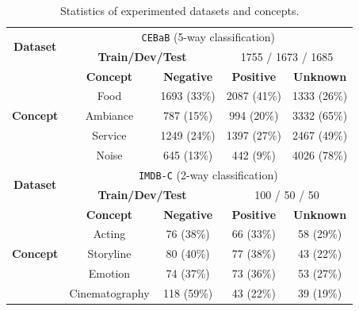 \documentclass[letterpaper]{article} %
\begin{document}
\begin{table}[t]
\centering
\setlength{\tabcolsep}{1pt} %
\fontsize{9pt}{10pt}\selectfont
\begin{tabular}{@{}c|cccc@{}}
\toprule
\multirow{2}{*}{\textbf{Dataset}} & \multicolumn{4}{c}{\texttt{CEBaB}    (5-way classification)}                                   \\ \cmidrule(l){2-5}
                                  & \multicolumn{2}{c|}{\textbf{Train/Dev/Test}} & \multicolumn{2}{c}{1755 / 1673 / 1685} \\ \midrule
\multirow{5}{*}{\textbf{Concept}} & \textbf{Concept}      & \textbf{Negative}    & \textbf{Positive}  & \textbf{Unknown}  \\ \cmidrule(l){2-5}
                                  & Food                  & 1693 (33\%)        & 2087 (41\%)      & 1333 (26\%)     \\
                                  & Ambiance              & 787 (15\%)         & 994 (20\%)       & 3332 (65\%)     \\
                                  & Service               & 1249 (24\%)        & 1397 (27\%)      & 2467 (49\%)     \\
                                  & Noise                 & 645 (13\%)         & 442 (9\%)        & 4026 (78\%)     \\ \midrule
\multirow{2}{*}{\textbf{Dataset}} & \multicolumn{4}{c}{\texttt{IMDB-C}    (2-way classification)}                                    \\ \cmidrule(l){2-5}
                                  & \multicolumn{2}{c|}{\textbf{Train/Dev/Test}} & \multicolumn{2}{c}{100 / 50 / 50}      \\ \midrule
\multirow{5}{*}{\textbf{Concept}} & \textbf{Concept}      & \textbf{Negative}    & \textbf{Positive}  & \textbf{Unknown}  \\ \cmidrule(l){2-5}
                                  & Acting                & 76 (38\%)            & 66 (33\%)          & 58 (29\%)         \\
                                  & Storyline             & 80 (40\%)            & 77 (38\%)        & 43 (22\%)       \\
                                  & Emotion     & 74 (37\%)            & 73 (36\%)        & 53 (27\%)       \\
                                  & Cinematography        & 118 (59\%)           & 43 (22\%)        & 39 (19\%)       \\ \bottomrule
\end{tabular}
\caption{Statistics of experimented datasets and concepts.}\label{tab:data}
\end{table}
\end{document}
